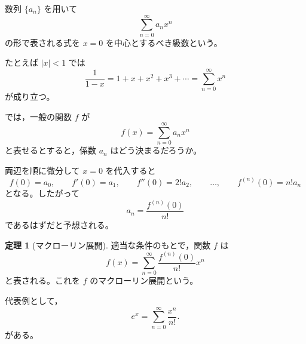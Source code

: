 \documentclass[a4paper,12pt]{jsarticle}
\theoremstyle{definition}
\newtheorem*{theorem}{定理}
\begin{document}
数列 $\{a_n\}$ を用いて
\[
\sum_{n=0}^{\infty} a_n x^n
\]
の形で表される式を $x=0$ を中心とするべき級数という。

たとえば $|x|<1$ では
\[
\frac{1}{1-x}=1+x+x^2+x^3+\cdots=\sum_{n=0}^{\infty} x^n
\]
が成り立つ。

では，一般の関数 $f$ が
\[
f(x)=\sum_{n=0}^{\infty} a_n x^n
\]
と表せるとすると，係数 $a_n$ はどう決まるだろうか。

両辺を順に微分して $x=0$ を代入すると
\[
f(0)=a_0,
\qquad
f'(0)=a_1,
\qquad
f''(0)=2!a_2,
\qquad
\dots,
\qquad
f^{(n)}(0)=n!a_n
\]
となる。したがって
\[
a_n=\frac{f^{(n)}(0)}{n!}
\]
であるはずだと予想される。

\begin{theorem}[マクローリン展開]
適当な条件のもとで，関数 $f$ は
\[
f(x)=\sum_{n=0}^{\infty}\frac{f^{(n)}(0)}{n!}x^n
\]
と表される。これを $f$ のマクローリン展開という。
\end{theorem}

代表例として，
\[
e^x=\sum_{n=0}^{\infty}\frac{x^n}{n!}.
\]
がある。
\end{document}
